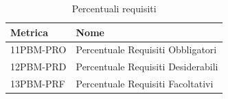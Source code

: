 \begin{table}[h!]
    \centering
    \renewcommand{\arraystretch}{1.5}
    \begin{table}[h!]
    \centering
    \renewcommand{\arraystretch}{1.5}
    \begin{tabular}{|>{\centering\arraybackslash}m{5cm}|>{\centering\arraybackslash}m{5cm}|}
        \hline
        \textbf{Metrica} & \textbf{Nome} \\
        \hline
        11PBM-PRO & Percentuale Requisiti Obbligatori \\
        \hline
        12PBM-PRD & Percentuale Requisiti Desiderabili \\
        \hline
        13PBM-PRF & Percentuale Requisiti Facoltativi \\
        \hline
    \end{tabular}
    \caption{Percentuali requisiti}
    \label{tab:percentuali_requisiti}
\end{table}


\end{table}

